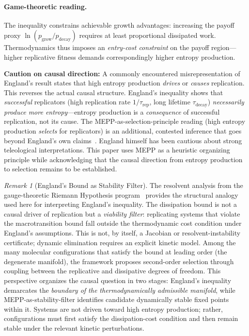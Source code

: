 \documentclass[12pt,a4paper]{article}
\theoremstyle{remark}
\newtheorem{remark}{Remark}
\begin{document}
\paragraph{Game-theoretic reading.} The inequality constrains achievable growth advantages: increasing the payoff proxy $\ln(p_{\mathrm{grow}} / p_{\mathrm{decay}})$ requires at least proportional dissipated work. Thermodynamics thus imposes an \emph{entry-cost constraint} on the payoff region---higher replicative fitness demands correspondingly higher entropy production.

\textbf{Caution on causal direction:} A commonly encountered misrepresentation of England's result states that high entropy production \emph{drives} or \emph{causes} replication. This reverses the actual causal structure. England's inequality shows that \emph{successful} replicators (high replication rate $1/\tau_{\mathrm{rep}}$, long lifetime $\tau_{\mathrm{decay}}$) \emph{necessarily produce more entropy}---entropy production is a \emph{consequence} of successful replication, not its cause. The MEPP-as-selection-principle reading (high entropy production \emph{selects} for replicators) is an additional, contested inference that goes beyond England's own claims~\citep{England2013}. England himself has been cautious about strong teleological interpretations. This paper uses MEPP as a heuristic organizing principle while acknowledging that the causal direction from entropy production to selection remains to be established.

\begin{remark}[England's Bound as Stability Filter]
\label{rem:england-stability-filter}
The resolvent analysis from the gauge-theoretic Riemann Hypothesis program~\citep{GeigerRH2026b} provides the structural analogy used here for interpreting England's inequality. The dissipation bound is not a causal driver of replication but a \emph{viability filter}: replicating systems that violate the macrotransition bound fall outside the thermodynamic cost condition under England's assumptions. This is not, by itself, a Jacobian or resolvent-instability certificate; dynamic elimination requires an explicit kinetic model. Among the many molecular configurations that satisfy the bound at leading order (the degenerate manifold), the framework proposes second-order selection through coupling between the replicative and dissipative degrees of freedom. This perspective organizes the causal question in two stages: England's inequality demarcates the \emph{boundary of the thermodynamically admissible manifold}, while MEPP-as-stability-filter identifies candidate dynamically stable fixed points within it. Systems are not driven toward high entropy production; rather, configurations must first satisfy the dissipation-cost condition and then remain stable under the relevant kinetic perturbations.
\end{remark}
\end{document}
